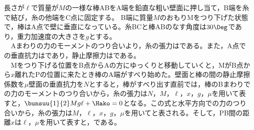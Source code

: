 \hakosyokika
\item
    \begin{mawarikomi}{150pt}{}
    長さが$\ell $で質量が$M$の一様な棒ABをA端を鉛直な粗い壁面に押し当て，B端を糸で結び，糸の他端をC点に固定する。
    B端に質量$M$のおもりMをつり下げた状態で，棒はA点で壁に垂直になっている。糸BCと棒ABのなす角度は$30\Deg$であり，重力加速度の大きさを$g$とする。\\
    ~~Aまわりの力のモーメントのつり合いより，糸の張力は\Hako である。また，A点での垂直抗力は\Hako であり，静止摩擦力は\Hako である。\\
    ~~Mをつり下げる位置をB点からAの方にゆっくりと移動していくと，MがB点から$x$離れたPの位置に来たとき棒のA端がすべり始めた。壁面と棒の間の静止摩擦係数を$\mu $壁面の垂直抗力を$N$とすると，棒がすべり出す直前では，棒のBまわりでの力のモーメントのつり合いから，糸の張力は$N$，$M$，$\ell $，$x$，$g$，$\mu $を用いて表すと，$\bunsuu{1}{2}Mg\ell + \Hako =0$となる。この式と水平方向での力のつり合いから，糸の張力は$M$，$\ell $，$x$，$g$，$\mu $を用いて\Hako と表される。そして，PB間の距離$x$は$\ell $，$\mu $を用いて表すと，\Hako である。
    \end{mawarikomi}